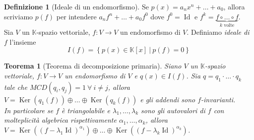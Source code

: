 \documentclass[11pt]{article}
\theoremstyle{plain}
\newtheorem{thm}{Teorema}[section]
\theoremstyle{definition}
\newtheorem{defn}{Definizione}[section]
\theoremstyle{remark}
\newcommand{\K}{\mathbb{K}}
\DeclareMathOperator{\Ker}{Ker}
\DeclareMathOperator{\Id}{Id}
\begin{document}
\begin{defn}[Ideale di un endomorfismo]
	Se $p(x)=a_n x^n+\ldots+a_0$, allora scriviamo $p(f)$ per intendere $a_nf^n+\ldots+a_0f^0$ dove $f^0=\Id$ e $f^k=\underbrace{f\circ\ldots\circ f}_{k \text{ volte}}$.\\
	Sia $V$ un $\K$-spazio vettoriale, $f:V\to V$ un endomorfismo di $V$. Definiamo \textit{ideale di $f$} l'insieme
	\[
		I(f)=\left\{ p(x)\in \K[x]\ |\ p(f)=0 \right\}
	\]
	

\end{defn}


\begin{thm}[Teorema di decomposizione primaria]
\label{thm:dec_primaria}
	Siano $V$ un $\K$-spazio vettoriale, $f:V\to V$ un endomorfismo di $V$ e $q(x)\in I(f)$. Sia $q=q_1\cdot\ldots\cdot q_k$ tale che $MCD(q_i,q_j)=1\ \forall\ i\neq j$, allora $V=\Ker(q_1(f))\oplus\dots\oplus \Ker(q_k(f))$ e gli addendi sono $f$-invarianti.\\
	In particolare se $f$ è triangolabile e $\lambda_1,\ldots,\lambda_k$ sono gli autovalori di $f$ con molteplicità algebrica rispettivamente $\alpha_1,\ldots,\alpha_k$, allora $V=\Ker\left((f-\lambda_1 \Id)^{\alpha_1}\right)\oplus\dots\oplus \Ker\left((f-\lambda_k \Id)^{\alpha_k}\right)$.
\end{thm}
\end{document}
